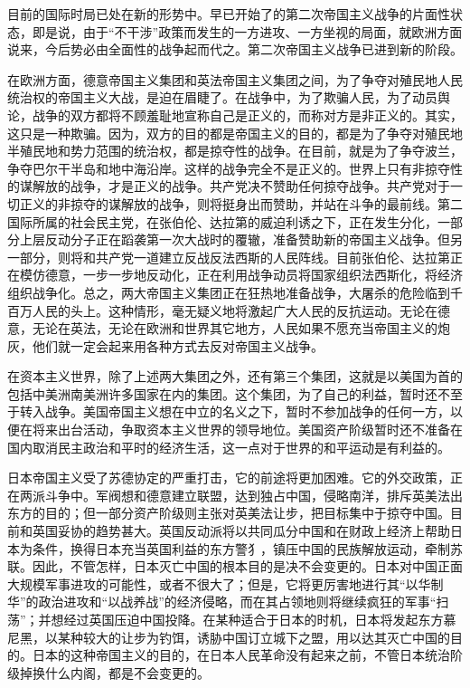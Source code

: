 目前的国际时局已处在新的形势中。早已开始了的第二次帝国主义战争的片面性状态，即是说，由于“不干涉”政策而发生的一方进攻、一方坐视的局面，就欧洲方面说来，今后势必由全面性的战争起而代之。第二次帝国主义战争已进到新的阶段。

在欧洲方面，德意帝国主义集团和英法帝国主义集团之间，为了争夺对殖民地人民统治权的帝国主义大战，是迫在眉睫了。在战争中，为了欺骗人民，为了动员舆论，战争的双方都将不顾羞耻地宣称自己是正义的，而称对方是非正义的。其实，这只是一种欺骗。因为，双方的目的都是帝国主义的目的，都是为了争夺对殖民地半殖民地和势力范围的统治权，都是掠夺性的战争。在目前，就是为了争夺波兰，争夺巴尔干半岛和地中海沿岸。这样的战争完全不是正义的。世界上只有非掠夺性的谋解放的战争，才是正义的战争。共产党决不赞助任何掠夺战争。共产党对于一切正义的非掠夺的谋解放的战争，则将挺身出而赞助，并站在斗争的最前线。第二国际所属的社会民主党，在张伯伦、达拉第的威迫利诱之下，正在发生分化，一部分上层反动分子正在蹈袭第一次大战时的覆辙，准备赞助新的帝国主义战争。但另一部分，则将和共产党一道建立反战反法西斯的人民阵线。目前张伯伦、达拉第正在模仿德意，一步一步地反动化，正在利用战争动员将国家组织法西斯化，将经济组织战争化。总之，两大帝国主义集团正在狂热地准备战争，大屠杀的危险临到千百万人民的头上。这种情形，毫无疑义地将激起广大人民的反抗运动。无论在德意，无论在英法，无论在欧洲和世界其它地方，人民如果不愿充当帝国主义的炮灰，他们就一定会起来用各种方式去反对帝国主义战争。

在资本主义世界，除了上述两大集团之外，还有第三个集团，这就是以美国为首的包括中美洲南美洲许多国家在内的集团。这个集团，为了自己的利益，暂时还不至于转入战争。美国帝国主义想在中立的名义之下，暂时不参加战争的任何一方，以便在将来出台活动，争取资本主义世界的领导地位。美国资产阶级暂时还不准备在国内取消民主政治和平时的经济生活，这一点对于世界的和平运动是有利益的。

日本帝国主义受了苏德协定的严重打击，它的前途将更加困难。它的外交政策，正在两派斗争中。军阀想和德意建立联盟，达到独占中国，侵略南洋，排斥英美法出东方的目的；但一部分资产阶级则主张对英美法让步，把目标集中于掠夺中国。目前和英国妥协的趋势甚大。英国反动派将以共同瓜分中国和在财政上经济上帮助日本为条件，换得日本充当英国利益的东方警犭，镇压中国的民族解放运动，牵制苏联。因此，不管怎样，日本灭亡中国的根本目的是决不会变更的。日本对中国正面大规模军事进攻的可能性，或者不很大了；但是，它将更厉害地进行其“以华制华”的政治进攻和“以战养战”的经济侵略，而在其占领地则将继续疯狂的军事“扫荡”；并想经过英国压迫中国投降。在某种适合于日本的时机，日本将发起东方慕尼黑，以某种较大的让步为钓饵，诱胁中国订立城下之盟，用以达其灭亡中国的目的。日本的这种帝国主义的目的，在日本人民革命没有起来之前，不管日本统治阶级掉换什么内阁，都是不会变更的。

